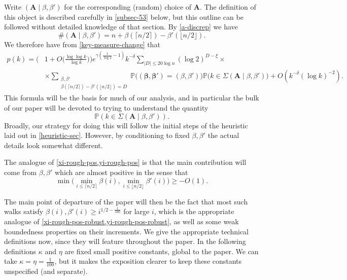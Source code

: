 \documentclass[11pt,reqno]{amsart}
\numberwithin{equation}{section}
\theoremstyle{definition}
\theoremstyle{remark}
\newcommand{\mb}{\mathbb}
\newcommand{\mbf}{\mathbf}
\def\boldbeta{\boldsymbol\beta}
\renewcommand{\le}{\leqslant}
\renewcommand{\ge}{\geqslant}
\begin{document}
Write $(\mbf{A} \mid \beta,\beta')$ for the corresponding (random) choice of $\mbf{A}$. The definition of this object is described carefully in \cref{subsec-53} below, but this outline can be followed without detailed knowledge of that section. By \cref{a-discrep} we have
\begin{equation*}  \# (\mbf{A} \mid \beta, \beta')  = n + \beta(\lceil n/2\rceil) - \beta'(\lfloor n/2\rfloor).  \end{equation*}
We therefore have from \cref{key-measure-change} that 
\begin{align}\nonumber  p(k) = \Big(& 1 + O\big(\frac{\log \log k}{\log k}\big) \Big)e^{\gamma(\frac{1}{\log 2} - 1)} k^{-\delta} \sum_{|D| \le 20 \log n}  (\log 2)^{D - \xi} \times \\ & \times \!\!\!\!\!\!\!\!\!\!\!\!\!\sum_{\substack{\beta,\beta' \\ \beta(\lceil n/2\rceil) - \beta'(\lfloor n/2\rfloor) = D}}\!\!\!\!\!\!\!\!\!\!\!\mb{P}\big((\boldbeta,\boldbeta') = (\beta, \beta')\big)  \mb{P}\big(k \in \Sigma(\mbf{A} \mid \beta,\beta')\big) + O(k^{-\delta} (\log k)^{-2}). \label{key-measure-change-cond}\end{align}
This formula will be the basis for much of our analysis, and in particular the bulk of our paper will be devoted to trying to understand the quantity 
\begin{equation}\label{key-a-beta} \mb{P}(k \in \Sigma(\mbf{A} \mid \beta,\beta')).\end{equation} Broadly, our strategy for doing this will follow the initial steps of the heuristic laid out in \cref{heuristic-sec}. However, by conditioning to fixed $\beta, \beta'$ the actual details look somewhat different.

The analogue of \cref{xi-rough-pos,yi-rough-pos} is that the main contribution will come from $\beta, \beta'$ which are almost positive in the sense that \begin{equation}\label{min-cond-overview} \min \big( \min_{i \le \lceil n/2\rceil} \beta(i), \min_{i \le \lfloor n/2\rfloor} \beta'(i)\big) \ge - O(1). \end{equation}

The main point of departure of the paper will then be the fact that most such walks satisfy $\beta(i),\beta'(i) \ge i^{1/2 - \frac{1}{100}}$ for large $i$, which is the appropriate analogue of \cref{xi-rough-pos-robust,yi-rough-pos-robust}, as well as some weak boundedness properties on their increments. We give the appropriate technical definitions now, since they will feature throughout the paper. In the following definitions $\kappa$ and $\eta$ are fixed small positive constants, global to the paper. We can take $\kappa = \eta = \frac{1}{100}$, but it makes the exposition clearer to keep these constants unspecified (and separate).
\end{document}
